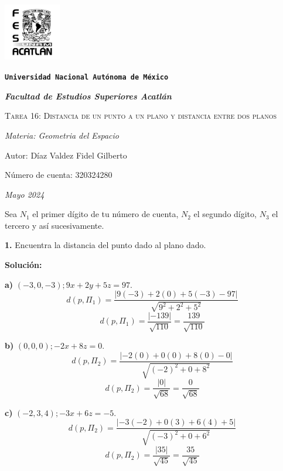 \documentclass{article}
\begin{document}
\begin{titlepage}
    \centering   
    {\includegraphics[width=2.5cm]{logo.png}\par}
    {\texttt{\bfseries \LARGE Universidad Nacional Autónoma de México} \par}
    \vspace{1cm}
    {\itshape \Large \bfseries Facultad de Estudios Superiores Acatlán \par}
    \vspace{3cm}
    {\scshape \Huge Tarea 16: Distancia de un punto a un plano y distancia entre dos planos\par}
    \vspace {3cm}
    {\slshape \Large Materia: Geometria del Espacio \par}
    \vspace{2cm}
    {\Large Autor: Díaz Valdez Fidel Gilberto\par}
    {\Large Número de cuenta: 320324280\par}
    \vfill
    {\itshape Mayo 2024 \par}
\end{titlepage}
Sea $N_1$ el primer dígito de tu número de cuenta, $N_2$ el segundo dígito, $N_3$ el tercero y así
sucesivamente.
\vspace{10pt}

\textbf{1.} Encuentra la distancia del punto dado al plano dado.
\vspace{10pt}

\textbf{Solución:}
\vspace{10pt}

\textbf{a)} $(-3,0,-3);9x+2y+5z=97$.
\vspace{10pt}
$$d(p,\Pi_1) = \frac{\left|9(-3)+2(0)+5(-3)-97\right|}{\sqrt{9^2+2^2+5^2}}$$
$$d(p,\Pi_1) = \frac{\left|-139\right|}{\sqrt{110}}= \frac{139}{\sqrt{110}}$$

\textbf{b)} $(0,0,0);-2x+8z=0$.
\vspace{10pt}
$$d(p,\Pi_2) = \frac{\left|-2(0)+0(0)+8(0)-0\right|}{\sqrt{(-2)^2+0+8^2}}$$
$$d(p,\Pi_2) = \frac{\left|0\right|}{\sqrt{68}}= \frac{0}{\sqrt{68}}$$

\textbf{c)} $(-2,3,4);-3x+6z=-5$.
\vspace{10pt}
$$d(p,\Pi_2) = \frac{\left|-3(-2)+0(3)+6(4)+5\right|}{\sqrt{(-3)^2+0+6^2}}$$
$$d(p,\Pi_2) = \frac{\left|35\right|}{\sqrt{45}}= \frac{35}{\sqrt{45}}$$
\end{document}
